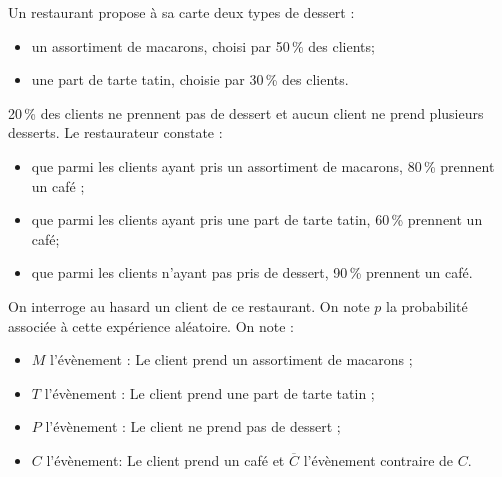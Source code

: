 \documentclass[a4paper,11pt]{article}
\begin{document}
\newpage


\medskip

Un restaurant propose à sa carte deux types de dessert :

\begin{itemize}
	\item un assortiment de macarons, choisi par 50\,\% des clients; 
	\item une part de tarte tatin, choisie par 30\,\% des clients.
\end{itemize}

20\,\% des clients ne prennent pas de dessert et aucun client ne prend plusieurs desserts. Le restaurateur constate :

\begin{itemize}
	\item que parmi les clients ayant pris un assortiment de macarons, 80\,\% prennent un café ; 
	\item que parmi les clients ayant pris une part de tarte tatin, 60\,\% prennent un café; 
	\item que parmi les clients n'ayant pas pris de dessert, 90\,\% prennent un café.
\end{itemize}

On interroge au hasard un client de ce restaurant. On note $p$ la probabilité associée à cette expérience aléatoire. On note :

\begin{itemize}
	\item $M$ l'évènement : \og Le client prend un assortiment de macarons \fg{} ; 
	\item $T$ l'évènement : \og Le client prend une part de tarte tatin \fg{} ; 
	\item $P$ l'évènement : \og Le client ne prend pas de dessert \fg{} ; 
	\item $C$ l'évènement: \og Le client prend un café \fg{} et $\overline{C}$ l'évènement contraire de $C$.
\end{itemize}
\end{document}
